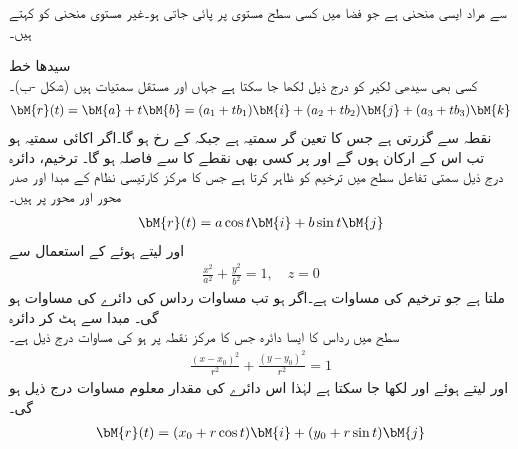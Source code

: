 سے مراد ایسی منحنی ہے جو فضا میں کسی سطح مستوی پر پائی جاتی ہو۔غیر مستوی منحنی کو  کہتے ہیں۔

\quad سیدھا خط\\
کسی بھی سیدھی لکیر  کو درج ذیل لکھا جا سکتا ہے جہاں  اور  مستقل سمتیات ہیں (شکل -ب)۔
\begin{align}
\bM{r}(t)=\bM{a}+t\bM{b}=(a_1+tb_1)\bM{i}+(a_2+tb_2)\bM{j}+(a_3+tb_3)\bM{k}
\end{align}
 نقطہ  سے گزرتی ہے جس کا تعین گر سمتیہ  ہے جبکہ  کے رخ   ہو گا۔اگر  اکائی سمتیہ ہو تب اس کے ارکان  ہوں گے اور  پر کسی بھی نقطے کا  سے فاصلہ   ہو گا۔
\quad ترخیم، دائرہ\\
درج ذیل سمتی تفاعل  سطح میں ترخیم کو ظاہر کرتا ہے جس کا مرکز کارتیسی نظام کے مبدا  اور صدر محور  اور  محور پر ہیں۔  
\begin{align}\label{مساوات_الاحصاء_ترخیم_الف}
\bM{r}(t)=a\cos t \bM{i}+b\sin t\bM{j}
\end{align}
 اور  لیتے ہوئے  کے استعمال سے 
\begin{align}
\frac{x^2}{a^2}+\frac{y^2}{b^2}=1, \quad z=0
\end{align}
ملتا ہے جو ترخیم کی مساوات ہے۔اگر  ہو تب مساوات  رداس  کی دائرے کی مساوات ہو گی۔
\quad مبدا سے ہٹ کر دائرہ\\
 سطح میں رداس  کا  ایسا دائرہ جس کا مرکز نقطہ  پر ہو کی مساوات درج ذیل ہے۔
\begin{align*}
\frac{(x-x_0)^2}{r^2}+\frac{(y-y_0)^2}{r^2}=1
\end{align*} 
 اور  لیتے ہوئے  اور  لکھا جا سکتا ہے لہٰذا اس دائرے کی مقدار معلوم مساوات درج ذیل ہو گی۔
\begin{align}
\bM{r}(t)=(x_0+r\cos t)\bM{i}+(y_0+r\sin t)\bM{j}
\end{align} 

